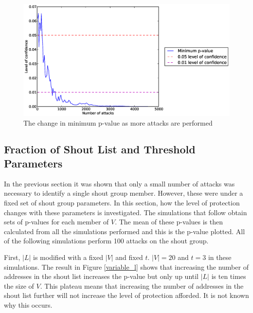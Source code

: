 \documentclass[ %
                    author={Luke Murray},
                supervisor={Dr. Simon Hollis},
                     title={Shadow Peer-to-Peer Networks},
                  subtitle={},
                    degree={MEng},
                      year={2013} ]{thesis}
\begin{document}
\begin{figure}[h]
    \centering
    \begin{minipage}[b]{0.9\linewidth}
        \centering
        \includegraphics[width=\linewidth]{diagrams/confidence_min.eps}
        \caption{The change in minimum p-value as more attacks are performed}
    \end{minipage}
    \label{confidence_min}
\end{figure}

\subsection{Fraction of Shout List and Threshold Parameters}

In the previous section it was shown that only a small number of attacks was necessary to identify a single shout group member. However, these were under a fixed set of shout group parameters. In this section, how the level of protection changes with these parameters is investigated. The simulations that follow obtain sets of p-values for each member of $V$. The mean of these p-values is then calculated from all the simulations performed and this is the p-value plotted. All of the following simulations perform 100 attacks on the shout group.

First, $|L|$ is modified with a fixed $|V|$ and fixed $t$. $|V| = 20$ and $t = 3$ in these simulations. The result in Figure \ref{variable_l} shows that increasing the number of addresses in the shout list increases the p-value but only up until $|L|$ is ten times the size of $V$. This plateau means that increasing the number of addresses in the shout list further will not increase the level of protection afforded. It is not known why this occurs.
\end{document}
